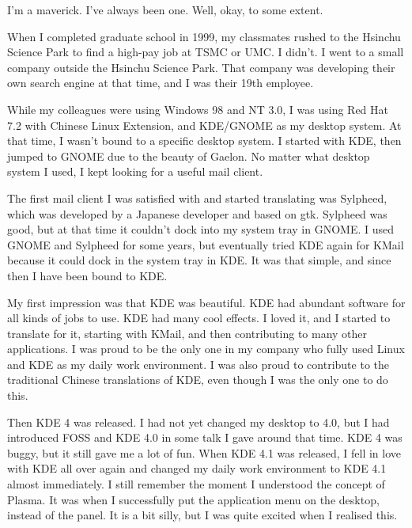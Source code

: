 


\noindent{}I'm a maverick. I've always been one. Well, okay, to some extent.

When I completed graduate school in 1999, my classmates
rushed to the Hsinchu Science Park to find a high-pay job at TSMC
or UMC. I didn't. I went to a small company outside the Hsinchu Science
Park. That company was developing their own search engine at that time,
and I was their 19th employee.

While my colleagues were using Windows 98 and NT 3.0, I was using Red Hat
7.2 with Chinese Linux Extension, and KDE/GNOME as my desktop system.
At that time, I wasn't bound to a specific desktop system. I started
with KDE, then jumped to GNOME due to the beauty of Gaelon. No matter what 
desktop system I used, I kept looking for a useful mail client.

The first mail client I was satisfied with and started translating was
Sylpheed, which was developed by a Japanese developer and based on
gtk. Sylpheed was good, but at that time it couldn't dock into my system
tray in GNOME. I used GNOME and Sylpheed for some years, but eventually 
tried KDE again for KMail because it could dock in the system tray in KDE. 
It was that simple, and since then I have been bound to KDE.

My first impression was that KDE was beautiful. KDE had abundant software for all kinds of jobs
to use. KDE had many cool effects. I loved it, and I started to translate
for it, starting with KMail, and then contributing to many other applications. I was proud to
be the only one in my company who fully used Linux and KDE as my daily
work environment. I was also proud to contribute to the traditional
Chinese translations of KDE, even though I was the only one to do
this.

Then KDE 4 was released. I had not yet changed my desktop to 4.0,
but I had introduced FOSS and KDE 4.0 in some talk I gave around that time. KDE 4
was buggy, but it still gave me a lot of fun. When KDE 4.1 was released, I
fell in love with KDE all over again and changed my daily work environment to
KDE 4.1 almost immediately. I still remember the moment I understood
the concept of Plasma. It was when I successfully put the application
menu on the desktop, instead of the panel. It is a bit silly,
but I was quite excited when I realised this.

